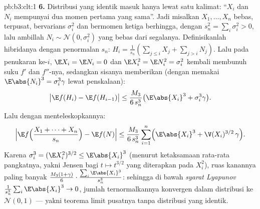 \begin{solution}{pb:b3:clt:1}
\textbf{6.} Distribusi yang identik masuk hanya lewat satu
kalimat: ``$X_i$ dan $N_i$ mempunyai dua momen pertama yang
sama''. Jadi misalkan $X_1, \dots, X_n$ bebas,
terpusat, bervarians $\sigma_i^2$ dan bermomen ketiga
berhingga, dengan $s_n^2 = \sum_i\sigma_i^2 > 0$, lalu ambillah $N_i \sim
\mathcal N(0, \sigma_i^2)$ yang bebas dari segalanya.
Definisikanlah hibridanya dengan penormalan $s_n$: $H_i =
\frac1{s_n}(\sum_{j\leq i}X_j + \sum_{j>i}N_j)$. Lalu pada
penukaran ke-$i$, $\E X_i = \E N_i = 0$ dan $\E X_i^2 = \E N_i^2
= \sigma_i^2$ kembali membunuh suku $f'$ dan $f''$-nya, sedangkan
sisanya memberikan (dengan memakai $\E\abs{N_i}^3 = \sigma_i^3\gamma$ lewat
penskalaan):
\[
\bigl|\E f(H_i) - \E f(H_{i-1})\bigr| \leq
\frac{M_3}{6\,s_n^3}\bigl(\E\abs{X_i}^3 +
\sigma_i^3\gamma\bigr) .
\]
Lalu dengan menteleskopkannya:
\[
\Bigl|\E f\Bigl(\frac{X_1 + \dots + X_n}{s_n}\Bigr) -
\E f(N)\Bigr| \leq \frac{M_3}{6\,s_n^3}\sum_{i=1}^n
\Bigl(\E\abs{X_i}^3 + \V(X_i)^{3/2}\,\gamma\Bigr) .
\]
Karena $\sigma_i^3 = (\E X_i^2)^{3/2} \leq \E\abs{X_i}^3$
(menurut ketaksamaan rata-rata pangkatnya, yakni Jensen bagi $t \mapsto
t^{3/2}$ yang diterapkan pada $X_i^2$), ruas kanannya paling banyak
$\frac{M_3(1 + \gamma)}{6}\cdot
\frac{\sum_i\E\abs{X_i}^3}{s_n^3}$: sehingga di bawah \emph{syarat
Lyapunov} $\frac1{s_n^3}\sum_i\E\abs{X_i}^3 \to 0$, jumlah
ternormalkannya konvergen dalam distribusi ke $\mathcal N(0,1)$ ---
yakni teorema limit pusatnya tanpa distribusi yang identik.


\end{solution}
